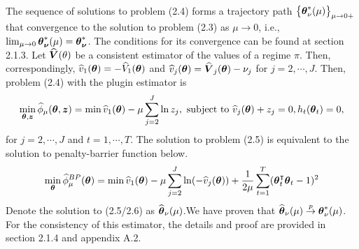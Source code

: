 The sequence of solutions to problem (2.4) forms a trajectory path $\left\{\boldsymbol{\theta}^*_{\nu}(\mu)\right\}_{\mu\to0+}$ that convergence to the solution to problem (2.3) as $\mu \to 0$, i.e., $\lim_{\mu \to 0}\boldsymbol{\theta}^*_{\boldsymbol{\nu}}(\mu)=\boldsymbol{\theta}^*_{\boldsymbol{\nu}}$. The conditions for its convergence can be found at section 2.1.3. Let $\widehat{\boldsymbol{V}}(\theta)$ be a consistent estimator of the values of a regime $\pi$. Then, correspondingly, $\widehat{v}_1(\boldsymbol{\theta}) = -\widehat{V}_1(\boldsymbol{\theta})$ and $\widehat{v}_j(\boldsymbol{\theta})=\widehat{\boldsymbol{V}}_j(\boldsymbol{\theta}) -\nu_j$ for $j = 2, \cdots, J$. Then, problem (2.4) with the plugin estimator is
\begin{equation}
\min_{\boldsymbol{\theta}, \boldsymbol{z}} \widehat{\phi}_{\mu}(\boldsymbol{\theta}, \boldsymbol{z}) = \min \widehat{v}_1(\boldsymbol{\theta}) - \mu \sum_{j=2}^J \ln z_j, \text{ subject to}\,\, \widehat{v}_j(\boldsymbol{\theta}) +z_j = 0, h_t(\boldsymbol{\theta}_t) = 0,
\end{equation}
for $j=2, \cdots, J$ and $t=1, \cdots, T$. The solution to problem (2.5) is equivalent to the solution to penalty-barrier function below. 
\begin{equation}
\min_{\boldsymbol{\theta}} \widehat{\phi}^{BP}_{\mu}(\boldsymbol{\theta}) = \min \widehat{v}_1(\boldsymbol{\theta}) - \mu \sum_{j=2}^J \ln (-\widehat{v}_j(\boldsymbol{\theta})) + \frac{1}{2\mu}\sum_{t=1}^{T}(\boldsymbol{\theta}^{\intercal}_t\boldsymbol{\theta}_t - 1)^2
\end{equation}
Denote the solution to (2.5/2.6) as $\widehat{\boldsymbol{\theta}}_{\nu}(\mu)$.We have proven that $\widehat{\boldsymbol{\theta}}_{\nu}(\mu) \overset{p}{\to} \boldsymbol{\theta}^*_{\nu}(\mu)$. For the consistency of this estimator, the details and proof are provided in section 2.1.4 and appendix A.2.
